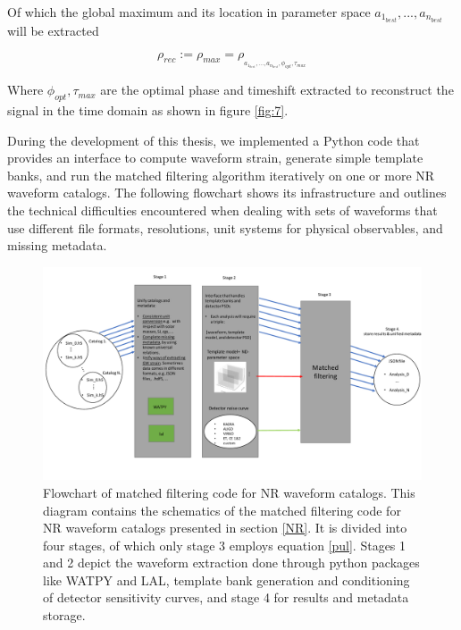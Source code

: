 Of which the global maximum and its location in parameter space $a_{1_{best}},...,a_{n_{best}}$ will be extracted 

\begin{equation}
\rho_{rec}:=\rho_{max} = \rho_{_{a_{1_{best}},...,a_{n_{best}},\phi_{opt},\tau_{max}}}
\end{equation}

Where $\phi_{opt},\tau_{max}$ are the optimal phase and timeshift extracted to reconstruct the signal in the time domain as shown in figure \ref{fig:7}. 

During the development of this thesis, we implemented a Python code that provides an interface to compute waveform strain, generate simple template banks, and run the matched filtering algorithm iteratively on one or more NR waveform catalogs. The following flowchart shows its infrastructure and outlines the technical difficulties encountered when dealing with sets of waveforms that use different file formats, resolutions, unit systems for physical observables, and missing metadata.


\newpage


\begin{figure}
\begin{center}
\includegraphics[width=\textwidth, angle=0]{images/cat_search.pdf}
\captionsetup{width=0.8\textwidth}
\caption[Flowchart of matched filtering code for NR waveform catalogs]{Flowchart of matched filtering code for NR waveform catalogs. This diagram contains the schematics of the matched filtering code for NR waveform catalogs presented in section \ref{NR}. It is divided into four stages, of which only stage 3 employs equation \ref{pul}. Stages 1 and 2 depict the waveform extraction done through python packages like WATPY and LAL, template bank generation and conditioning of detector sensitivity curves, and stage 4 for results and metadata storage.}
\label{fig:19}
\end{center}
\end{figure}

